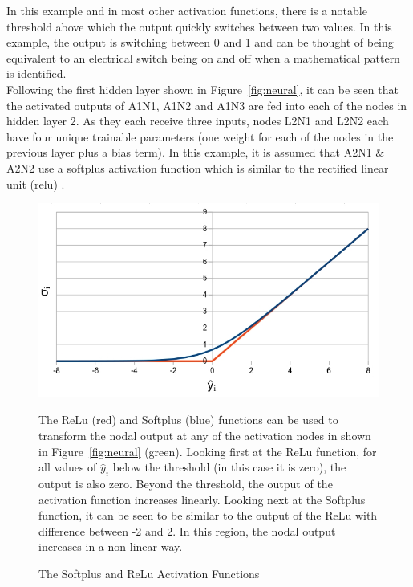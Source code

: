 \noindent
In this example and in most other activation functions, there is a notable threshold above which the output quickly switches between two values. In this example, the output is switching between 0 and 1 and can be thought of being equivalent to an electrical switch being on and off when a mathematical pattern is identified. \\


\noindent
Following the first hidden layer shown in Figure~\ref{fig:neural}, it can be seen that the activated outputs of A1N1, A1N2 and A1N3 are fed into each of the nodes in hidden layer 2.  As they each receive three inputs, nodes L2N1 and L2N2 each have four unique trainable parameters (one weight for each of the nodes in the previous layer plus a bias term). In this example, it is assumed that A2N1 \& A2N2 use a softplus activation function \cite{zheng2015improving} which is similar to the rectified linear unit (relu) \cite{hara2015analysis}. \\

\begin{figure}[p]
	\centering
	\includegraphics[scale=0.5]{Figures/softplus_relu.jpg}
	\caption{The Softplus and ReLu Activation Functions} {The ReLu (red) and Softplus (blue) functions can be used to transform the nodal output at any of the activation nodes in shown in Figure~\ref{fig:neural} (green). Looking first at the ReLu function, for all values of $\hat{y}_i$ below the threshold (in this case it is zero), the output is also zero. Beyond the threshold, the output of the activation function increases linearly. Looking next at the Softplus function, it can be seen to be similar to the output of the ReLu with difference between -2 and 2. In this region, the nodal output increases in a non-linear way.}
	\label{fig:soft_relu}
\end{figure}

